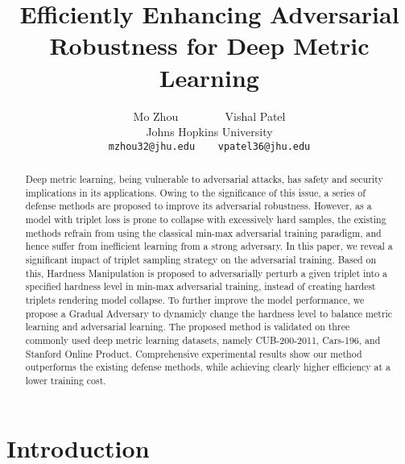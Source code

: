 \documentclass[10pt,twocolumn,letterpaper]{article}
\begin{document}
\title{Efficiently Enhancing Adversarial Robustness for Deep Metric Learning}

\author{Mo Zhou ~~~~~~~ Vishal Patel\\
Johns Hopkins University\\
{\tt\small mzhou32@jhu.edu ~~ vpatel36@jhu.edu}
}
\maketitle

\begin{abstract}
	Deep metric learning, being vulnerable to adversarial
	attacks, has safety and security implications in its applications.
	Owing to the significance of this issue, a series of defense methods
	are proposed to improve its adversarial robustness.
	However, as a model with triplet loss is prone to collapse with
	excessively hard samples, the existing methods refrain from using the
	classical min-max adversarial training paradigm, and hence suffer from
	inefficient learning from a strong adversary.
	In this paper, we reveal a significant impact of triplet sampling strategy
	on the adversarial training.
	Based on this, Hardness Manipulation is proposed to adversarially perturb
	a given triplet into a specified hardness level in min-max adversarial
	training, instead of creating hardest triplets rendering model collapse.
	To further improve the model performance, we propose a Gradual
	Adversary to dynamicly change the hardness level to balance metric
	learning and adversarial learning.
	The proposed method is validated on three commonly
	used deep metric learning datasets, namely CUB-200-2011, Cars-196,
	and Stanford Online Product.
	Comprehensive experimental results show our method outperforms
	the existing defense methods, while achieving clearly higher
	efficiency at a lower training cost.
\end{abstract}

\section{Introduction}
\label{sec:1}
\end{document}
